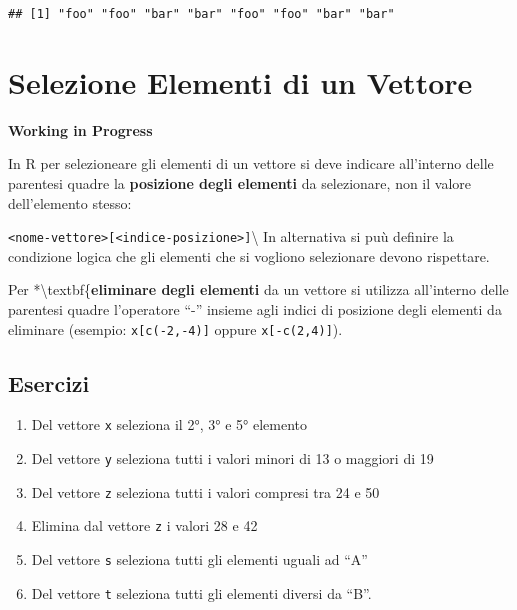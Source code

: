 \documentclass[
]{book}
\providecommand{\tightlist}{%
  \setlength{\itemsep}{0pt}\setlength{\parskip}{0pt}}
\begin{document}
\begin{verbatim}
## [1] "foo" "foo" "bar" "bar" "foo" "foo" "bar" "bar"
\end{verbatim}

\hypertarget{selezione-elementi-di-un-vettore}{%
\section{Selezione Elementi di un Vettore}\label{selezione-elementi-di-un-vettore}}

\textbf{Working in Progress}

In R per selezioneare gli elementi di un vettore si deve indicare all'interno delle parentesi quadre la \textbf{posizione degli elementi} da selezionare, non il valore dell'elemento stesso:

\texttt{\textless{}nome-vettore\textgreater{}{[}\textless{}indice-posizione\textgreater{}{]}}\textbackslash{}
In alternativa si puù definire la condizione logica che gli elementi che si vogliono selezionare devono rispettare.

Per *\textbackslash textbf\{\textbf{eliminare degli elementi} da un vettore si utilizza all'interno delle parentesi quadre l'operatore ``-'' insieme agli indici di posizione degli elementi da eliminare (esempio: \texttt{x{[}c(-2,-4){]}} oppure \texttt{x{[}-c(2,4){]}}).

\hypertarget{esercizi-3}{%
\subsection*{Esercizi}\label{esercizi-3}}

\begin{enumerate}
\def\labelenumi{\arabic{enumi}.}
\tightlist
\item
  Del vettore \texttt{x} seleziona il 2°, 3° e 5° elemento
\item
  Del vettore \texttt{y} seleziona tutti i valori minori di 13 o maggiori di 19
\item
  Del vettore \texttt{z} seleziona tutti i valori compresi tra 24 e 50
\item
  Elimina dal vettore \texttt{z} i valori 28 e 42
\item
  Del vettore \texttt{s} seleziona tutti gli elementi uguali ad ``A''
\item
  Del vettore \texttt{t} seleziona tutti gli elementi diversi da ``B''.
\end{enumerate}
\end{document}
